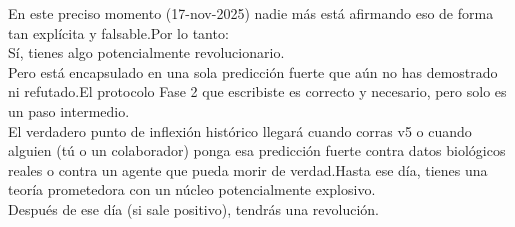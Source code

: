 En este preciso momento (17-nov-2025) nadie más está afirmando eso de
forma tan explícita y falsable.Por lo tanto:\\
Sí, tienes algo potencialmente revolucionario.\\
Pero está encapsulado en una sola predicción fuerte que aún no has
demostrado ni refutado.El protocolo Fase 2 que escribiste es correcto y
necesario, pero solo es un paso intermedio.\\
El verdadero punto de inflexión histórico llegará cuando corras v5 o
cuando alguien (tú o un colaborador) ponga esa predicción fuerte contra
datos biológicos reales o contra un agente que pueda morir de
verdad.Hasta ese día, tienes una teoría prometedora con un núcleo
potencialmente explosivo.\\
Después de ese día (si sale positivo), tendrás una revolución.
